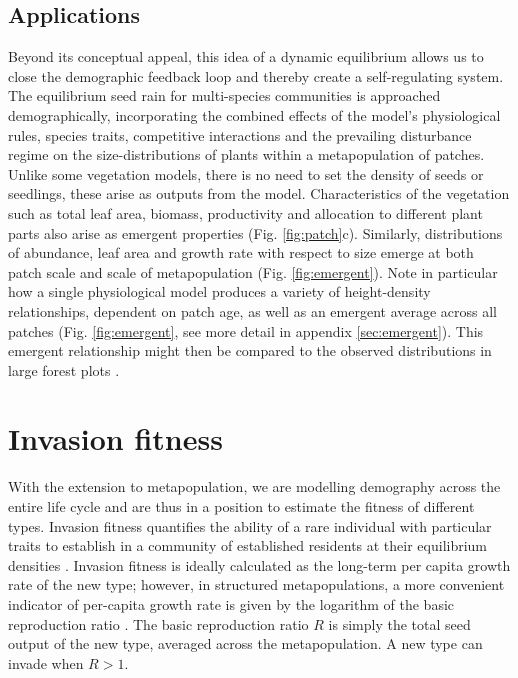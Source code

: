 \documentclass[a4paper,11pt]{article}
\begin{document}
\subsection{Applications}

Beyond its conceptual appeal, this idea of a dynamic equilibrium
allows us to close the demographic feedback loop and thereby create a
self-regulating system. The equilibrium seed rain for multi-species
communities is approached demographically, incorporating the combined
effects of the model's physiological rules, species traits,
competitive interactions and the prevailing disturbance regime on the
size-distributions of plants within a metapopulation of
patches. Unlike some vegetation models, there is no need to set the
density of seeds or seedlings, these arise as outputs from the
model. Characteristics of the vegetation such as total leaf area,
biomass, productivity and allocation to different plant parts also
arise as emergent properties (Fig.  \ref{fig:patch}c). Similarly,
distributions of abundance, leaf area and growth rate with respect to
size emerge at both patch scale and scale of metapopulation
(Fig. \ref{fig:emergent}). Note in particular how a single
physiological model produces a variety of height-density
relationships, dependent on patch age, as well as an emergent average
across all patches (Fig. \ref{fig:emergent}, see more detail in
appendix \ref{sec:emergent}). This emergent relationship might then be
compared to the observed distributions in large forest plots
\citep{Muller-2006}.

\section{Invasion fitness}

With the extension to metapopulation, we are modelling demography across
the entire life cycle and are thus in a position to estimate the fitness
of different types. Invasion fitness quantifies the ability of a rare
individual with particular traits to establish in a community of
established residents at their equilibrium densities \citep{Metz-1992}.
Invasion fitness
is ideally calculated as the long-term per capita growth rate of the new
type; however, in structured metapopulations, a more convenient
indicator of per-capita growth rate is given by the logarithm of the
basic reproduction ratio \citep{Gyllenberg-2001, Metz-2001}. The basic
reproduction ratio \(R\) is simply the total seed output of the new
type, averaged across the metapopulation. A new type can invade when
\(R > 1\).
\end{document}
